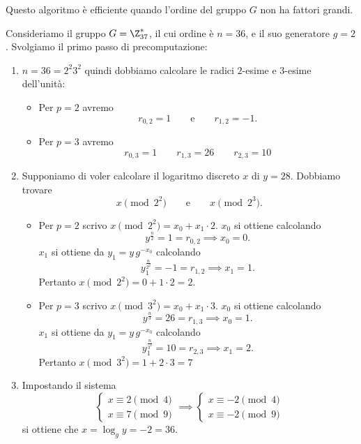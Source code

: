 	\begin{oss}
	Questo algoritmo è efficiente quando l'ordine del gruppo \(G\) non ha fattori grandi.
	\end{oss}

	\begin{ese}
	Consideriamo il gruppo \(G=\Z_{37}^*\), il cui ordine è \(n=36\), e il suo generatore \(g=2\). Svolgiamo il primo passo di precomputazione:
	\begin{enumerate}
		\item \(n=36=2^2 3^2\) quindi dobbiamo calcolare le radici \(2\)-esime e \(3\)-esime dell'unità:
		\begin{itemize}
			\item Per \(p=2\) avremo
				\[
				r_{0,2} = 1 \qquad\text{e}\qquad r_{1,2} = -1.
				\]
			\item Per \(p=3\) avremo
				\[
				r_{0,3} = 1 \qquad r_{1,3} = 26 \qquad r_{2,3} = 10
				\]
		\end{itemize}
		\item Supponiamo di voler calcolare il logaritmo discreto \(x\) di \(y=28\). Dobbiamo trovare
			\[
			x \pmod{2^2} \qquad\text{e}\qquad x \pmod{2^3}.
			\]
		\begin{itemize}
			\item Per \(p=2\) scrivo \(x \pmod{2^2} = x_0 + x_1 \cdot 2\). \(x_0\) si ottiene calcolando
				\[
				y^{\frac{n}{2}} = 1 = r_{0,2} \implies x_0 = 0.
				\]
			\(x_1\) si ottiene da \(y_1=y\,g^{-x_0}\) calcolando
				\[
				y_1^{\frac{n}{2^2}} = -1 = r_{1,2} \implies x_1 = 1.
				\]
			Pertanto \(x\pmod{2^2} = 0+1 \cdot 2 = 2\).
			\item Per \(p=3\) scrivo \(x \pmod{3^2} = x_0 + x_1 \cdot 3\). \(x_0\) si ottiene calcolando
				\[
				y^{\frac{n}{3}} = 26 = r_{1,3} \implies x_0 = 1.
				\]
			\(x_1\) si ottiene da \(y_1=y\,g^{-x_0}\) calcolando
				\[
				y_1^{\frac{n}{3^2}} = 10 = r_{2,3} \implies x_1 = 2.
				\]
			Pertanto \(x \pmod{3^2} = 1 + 2 \cdot 3 = 7\)
		\end{itemize}
		\item Impostando il sistema
			\[
			\begin{cases}
			x \equiv 2 \pmod{4}\\
			x \equiv 7 \pmod{9}
			\end{cases} \implies
			\begin{cases}
			x \equiv -2 \pmod{4}\\
			x \equiv -2 \pmod{9}
			\end{cases}
			\]
		si ottiene che \(x=\log_g y = -2 = 36\).
	\end{enumerate}
	\end{ese}

